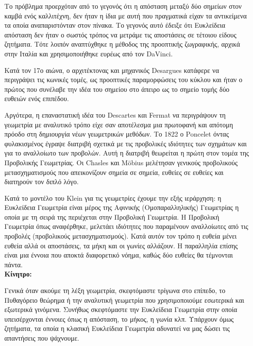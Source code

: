 \documentclass[12pt, a4paper]{book}
\begin{document}
Το πρόβλημα προερχόταν από το γεγονός ότι η απόσταση μεταξύ δύο σημείων στον καμβά ενός καλλιτέχνη, δεν ήταν η ίδια με αυτή που πραγματικά είχαν τα αντικείμενα τα οποία αναπαριστόνταν στον πίνακα. Το γεγονός αυτό έδειξε ότι  Ευκλείδεια απόσταση δεν ήταν ο σωστός τρόπος να μετράμε τις αποστάσεις σε τέτοιου είδους ζητήματα. Τότε λοιπόν αναπτύχθηκε η μέθοδος της προοπτικής ζωγραφικής, αρχικά στην Ιταλία και χρησιμοποιήθηκε ευρέως από τον \foreignlanguage{english}{DaVinci}.

Κατά τον 17ο αιώνα, ο αρχιτέκτονας και μηχανικός \foreignlanguage{english}{Desargues} κατάφερε να περιγράψει τις κωνικές τομές, ως προοπτικές παραμορφώσεις του κύκλου και ήταν ο πρώτος που συνέλαβε την ιδέα του σημείου στο άπειρο ως το σημείο τομής δύο ευθειών ενός επιπέδου.

Αργότερα, η επαναστατική ιδέα του \foreignlanguage{english}{Descartes} και \foreignlanguage{english}{Fermat} να περιγράψουν τη γεωμετρία με αναλυτικό τρόπο είχε σαν αποτέλεσμα μια πρωτοφανή και απότομη πρόοδο στη δημιουργία νέων γεωμετρικών μεθόδων. Το 1822 ο \foreignlanguage{english}{Poncelet} όντας φυλακισμένος έγραψε διατριβή σχετικά με τις προβολικές ιδιότητες των σχημάτων και για το αναλλοίωτο των προβολών. Αυτή η διατριβή θεωρείται η πρώτη στον τομέα της Προβολικής Γεωμετρίας.  Οι \foreignlanguage{english}{Chasles} και \foreignlanguage{english}{Möbius} μελέτησαν γενικούς προβολικούς μετασχηματισμούς που απεικονίζουν σημεία σε σημεία, ευθείες σε ευθείες και διατηρούν τον διπλό λόγο.
 
Κατά το μοντέλο του \foreignlanguage{english}{Klein} για τις γεωμετρίες έχουμε την εξής ιεράρχηση: η Ευκλείδεια Γεωμετρία είναι μέρος της Αφινικής (Ομοπαραλληλικής) Γεωμετρίας η οποία με τη σειρά της περιέχεται στην Προβολική Γεωμετρία. Η Προβολική Γεωμετρία όπως αναφέρθηκε, μελετάει ιδιότητες που παραμένουν αναλλοίωτες από τις προβολές (προβολικούς μετασχηματισμούς). Κατά αυτόν τον τρόπο η ευθεία μένει ευθεία αλλά οι αποστάσεις, τα μήκη και οι γωνίες αλλάζουν. Η παραλληλία επίσης είναι μια έννοια που αποκτά διαφορετικό νόημα, καθώς δύο ευθείες θα τέμνονται πάντα.
\\


\textbf{Κίνητρο:}

Γενικά όταν ακούμε τη λέξη γεωμετρία, σκεφτόμαστε τρίγωνα στο επίπεδο, το Πυθαγόρειο θεώρημα ή την αναλυτική γεωμετρία που χρησιμοποιούμε εσωτερικά και εξωτερικά γινόμενα. Συνήθως σκεφτόμαστε την Ευκλείδεια Γεωμετρία στην οποία υπεισέρχονται έννοιες όπως η απόσταση, το μήκος, η γωνία κλπ. Υπάρχουν όμως ζητήματα, τα οποία η κλασική Ευκλείδεια Γεωμετρία αδυνατεί να μας δώσει τις απαντήσεις που ψάχνουμε.
\end{document}
